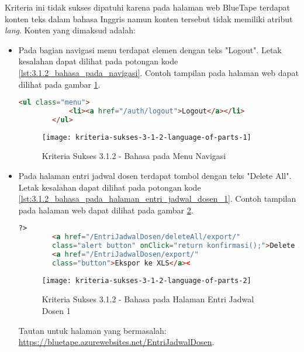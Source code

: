 Kriteria ini tidak sukses dipatuhi karena pada halaman web BlueTape terdapat konten teks dalam bahasa Inggris namun konten tersebut tidak memiliki atribut \textit{lang}. Konten yang dimaksud adalah:

\begin{itemize}
    \item Pada bagian navigasi menu terdapat elemen dengan teks "Logout". Letak kesalahan dapat dilihat pada potongan kode \ref{lst:3.1.2_bahasa_pada_navigasi}. Contoh tampilan pada halaman web dapat dilihat pada gambar \ref{fig:3.1.2_language_of_parts_1}. 
    \begin{lstlisting}[frame=single, label={lst:3.1.2_bahasa_pada_navigasi}, language=HTML, caption=Kriteria Sukses 3.1.2 - Bahasa yang Tidak Sesuai pada Menu Navigasi]
        <ul class="menu">
            <li><a href="/auth/logout">Logout</a></li>
        </ul>
    \end{lstlisting}
    
    \begin{figure}[H]
        \centering  
        \texttt{[image: kriteria-sukses-3-1-2-language-of-parts-1]}  
        \caption[Kriteria Sukses 3.1.2 - Bahasa pada Menu Navigasi]{Kriteria Sukses 3.1.2 - Bahasa pada Menu Navigasi}
        \label{fig:3.1.2_language_of_parts_1}  
    \end{figure}

    \item Pada halaman entri jadwal dosen terdapat tombol dengan teks "Delete All". Letak kesalahan dapat dilihat pada potongan kode \ref{lst:3.1.2_bahasa_pada_halaman_entri_jadwal_dosen_1}. Contoh tampilan pada halaman web dapat dilihat pada gambar \ref{fig:3.1.2_language_of_parts_2}. 
    \begin{lstlisting}[frame=single, label={lst:3.1.2_bahasa_pada_halaman_entri_jadwal_dosen_1}, language=HTML, caption=Kriteria Sukses 3.1.2 - Bahasa yang Tidak Sesuai pada Halaman Entri Jadwal Dosen 1]
        ?>
        <a href="/EntriJadwalDosen/deleteAll/export/" 
        class="alert button" onClick="return konfirmasi();">Delete All</a>
        <a href="/EntriJadwalDosen/export/" 
        class="button">Ekspor ke XLS</a><
    \end{lstlisting}
    
    \begin{figure}[H]
        \centering  
        \texttt{[image: kriteria-sukses-3-1-2-language-of-parts-2]}  
        \caption[Kriteria Sukses 3.1.2 - Bahasa pada Halaman Entri Jadwal Dosen 1]{Kriteria Sukses 3.1.2 - Bahasa pada Halaman Entri Jadwal Dosen 1}
        \label{fig:3.1.2_language_of_parts_2}  
    \end{figure}
    Tautan untuk halaman yang bermasalah: \url{https://bluetape.azurewebsites.net/EntriJadwalDosen}.


\end{itemize}
